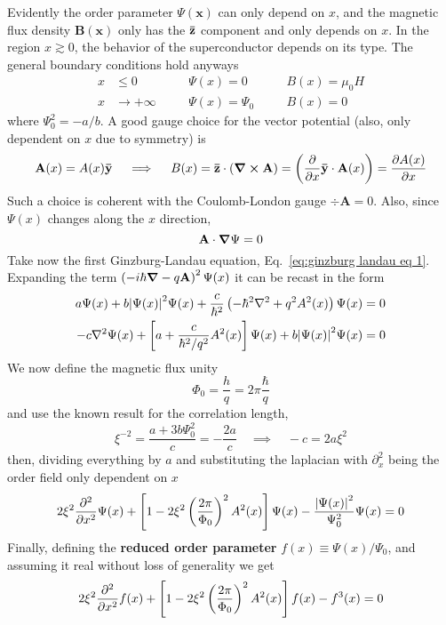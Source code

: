 Evidently the order parameter $\Psi(\mathbf{x})$ can only depend on $x$, and the magnetic flux density $\mathbf{B}(\mathbf{x})$ only has the $\mathbf{\bar{z}}$ component and only depends on $x$. In the region $x \gtrsim 0$, the behavior of the superconductor depends on its type. The general boundary conditions hold anyways
\[  
\begin{aligned}
    x &\le 0 \hspace{1em}&&\Psi(x) = 0 \hspace{1em}&&B(x)=\mu_0 H \\
    x &\to +\infty \hspace{1em}&&\Psi(x) = \Psi_0 \hspace{1em}&&B(x)=0
\end{aligned}
\]
where $\Psi_0^2 = - a/b$. A good gauge choice for the vector potential (also, only dependent on $x$ due to symmetry) is
\[
    \mathbf{A}(x) = A(x) \mathbf{\bar{y}}
    \quad\implies\quad
    B(x) = \mathbf{\bar{z}} \cdot \left({\curl\mathbf{A}}\right) = \left({\pdv{}{x} \mathbf{\bar{y}} \cdot \mathbf{A}(x)}\right) = \pdv{A(x)}{x}
\]
Such a choice is coherent with the Coulomb-London gauge $\div\mathbf{A}=0$. Also, since $\Psi(x)$ changes along the $x$ direction, 
\[
    \mathbf{A} \cdot \grad\Psi = 0
\]
Take now the first Ginzburg-Landau equation, Eq.~\eqref{eq:ginzburg landau eq 1}. Expanding the term $\left({ -i\hbar\grad - q \mathbf{A} }\right)^2 \Psi(x)$  it can be recast in the form
\[
\begin{aligned}
    a \Psi(x) + b \abs{\Psi(x)}^2 \Psi(x) + \frac{c}{\hbar^2} \lrR{ -\hbar^2 \laplacian + q^2 A^2(x) } \Psi(x) &= 0 \\
    - c \laplacian\Psi(x) + \lrS{a + \frac{c}{\hbar^2/q^2} A^2(x)} \Psi(x) + b \abs{\Psi(x)}^2 \Psi(x) &= 0
\end{aligned}
\]
We now define the magnetic flux unity
\[
    \Phi_0 = \frac{h}{q} = 2\pi \frac{\hbar}{q}
\]
and use the known result for the correlation length,
\[  
    \xi^{-2} = \frac{a + 3b\Psi_0^2}{c} = - \frac{2a}{c}
    \quad\implies\quad
    -c = 2a \xi^2
\]
then, dividing everything by $a$ and substituting the laplacian with $\partial_x^2$ being the order field only dependent on $x$
\[
    2\xi^2 \pdv[2]{}{x} \Psi(x) + \left[{1 - 2\xi^2 \left({\frac{2\pi}{\Phi_0}}\right)^2 A^2(x)}\right] \Psi(x) - \frac{ \abs{\Psi(x)}^2 }{\Psi_0^2} \Psi(x) = 0
\]
Finally, defining the \textbf{reduced order parameter} $f(x) \equiv \Psi(x)/\Psi_0$, and assuming it real without loss of generality we get
\begin{equation}\label{eq:reduced ginzburg landau eq 1}
    2\xi^2 \pdv[2]{}{x} f(x) + \left[{1 - 2\xi^2 \left({\frac{2\pi}{\Phi_0}}\right)^2 A^2(x)}\right] f(x) - f^3(x) = 0
\end{equation}
